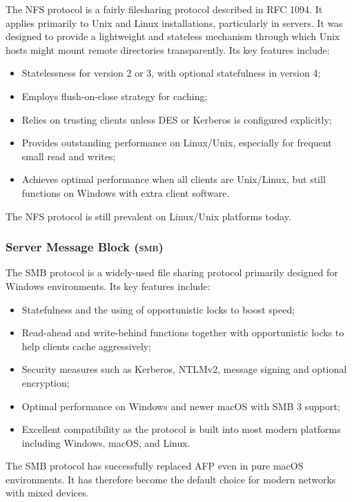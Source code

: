 The NFS protocol is a fairly filesharing protocol described in RFC
1094\cite{NFSNetworkFile1989,eriksenCOMPARISONNFSSAMBA}. It applies primarily to Unix and Linux installations, particularly in servers. It was designed to provide a lightweight and stateless mechanism through which Unix hosts might mount remote directories transparently. Its key features include:
\begin{itemize}[nosep]
    \item Statelessness for version 2 or 3, with optional statefulness in
          version 4;
    \item Employs flush-on-close strategy for caching;
    \item Relies on trusting clients unless DES or Kerberos is configured
          explicitly;
    \item Provides outstanding performance on Linux/Unix, especially for
          frequent small read and writes;
    \item Achieves optimal performance when all clients are Unix/Linux, but
          still functions on Windows with extra client software.
\end{itemize}
The NFS protocol is still prevalent on Linux/Unix platforms today.
\subsubsection{Server Message Block (\textsc{smb})}

The SMB protocol is a widely-used file sharing protocol primarily designed for
Windows environments. Its key features include\cite{eriksenCOMPARISONNFSSAMBA}:
\begin{itemize}[nosep]
    \item Statefulness and the using of opportunistic locks to boost speed;
    \item Read-ahead and write-behind functions together with opportunistic
          locks to help clients cache aggressively;
    \item Security measures such as Kerberos, NTLMv2, message signing and
          optional encryption;
    \item Optimal performance on Windows and newer macOS with SMB 3 support;
    \item Excellent compatibility as the protocol is built into most modern
          platforms including Windows, macOS, and Linux.
\end{itemize}
The SMB protocol has successfully replaced AFP even in pure macOS environments.
It has therefore become the default choice for modern networks with mixed devices.
